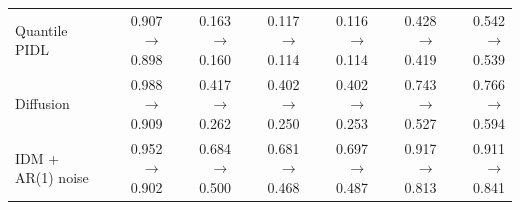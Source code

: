 \begin{table}[htbp]
\begin{tabular}{lrrrrrr}
Quantile PIDL & 0.907 $\rightarrow$ 0.898 & 0.163 $\rightarrow$ 0.160 & 0.117 $\rightarrow$ 0.114 & 0.116 $\rightarrow$ 0.114 & 0.428 $\rightarrow$ 0.419 & 0.542 $\rightarrow$ 0.539 \\
Diffusion & 0.988 $\rightarrow$ 0.909 & 0.417 $\rightarrow$ 0.262 & 0.402 $\rightarrow$ 0.250 & 0.402 $\rightarrow$ 0.253 & 0.743 $\rightarrow$ 0.527 & 0.766 $\rightarrow$ 0.594 \\
IDM + AR(1) noise & 0.952 $\rightarrow$ 0.902 & 0.684 $\rightarrow$ 0.500 & 0.681 $\rightarrow$ 0.468 & 0.697 $\rightarrow$ 0.487 & 0.917 $\rightarrow$ 0.813 & 0.911 $\rightarrow$ 0.841 \\
\bottomrule
\end{tabular}
\end{table}

